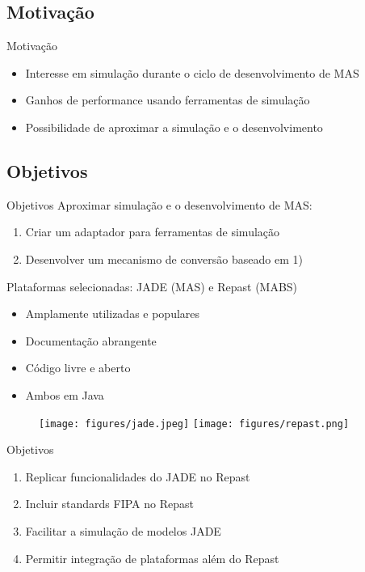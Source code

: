\subsection{Motivação}
\begin{frame}{Motivação}
	\begin{itemize}
		\item Interesse em simulação durante o ciclo de desenvolvimento de MAS
		\item Ganhos de performance usando ferramentas de simulação
		\item Possibilidade de aproximar a simulação e o desenvolvimento
	\end{itemize}
\end{frame}

\subsection{Objetivos}
\begin{frame}{Objetivos}
	Aproximar simulação e o desenvolvimento de MAS:
	\begin{enumerate}
		\item Criar um adaptador para ferramentas de simulação
		\item Desenvolver um mecanismo de conversão baseado em 1)
	\end{enumerate}
	\vspace{0.5cm}
	Plataformas selecionadas: JADE (MAS) e Repast (MABS)

		\begin{itemize}
			\item Amplamente utilizadas e populares
			\item Documentação abrangente
			\item Código livre e aberto
			\item Ambos em Java
		\end{itemize}

	\begin{figure}
		\texttt{[image: figures/jade.jpeg]}
		\hspace{1cm}
		\texttt{[image: figures/repast.png]}
	\end{figure}
\end{frame}

\begin{frame}{Objetivos}
	\begin{enumerate}
		\item Replicar funcionalidades do JADE no Repast
		\item Incluir standards FIPA no Repast
		\item Facilitar a simulação de modelos JADE
		\item Permitir integração de plataformas além do Repast
	\end{enumerate}
\end{frame}